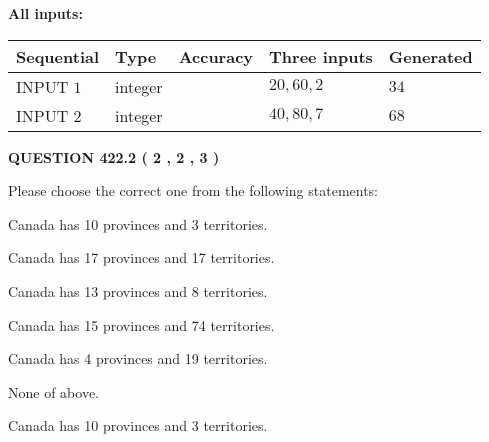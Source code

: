 \documentclass[12pt]{article}
\begin{document}
   
   
   
\noindent{}
   
   
   
   
\noindent\vspace{0.1in}\hspace{-0.08in} {\textbf{\Large{All inputs: }}}
   
   
  
  
\noindent\begin{tabular}{|l|l|l|l|l|}
\hline
 Sequential & Type & Accuracy & Three inputs & Generated \\ 
\hline
 
 
  INPUT $  1 $ & integer &  & $
 20
 , 
 60
 , 
 2
 $ & $ 34 $ 
 \\  \hline  
 
 
  INPUT $  2 $ & integer &  & $
 40
 , 
 80
 , 
 7
 $ & $ 68 $ 
 \\  \hline  
 \end{tabular}
   
   
  
\vspace{0.2in}
  
{\textbf{\Large{QUESTION
422.2 
 ( 2 , 2 , 3 )
}}}
  
  
Please choose the correct one from the following statements:
 
 
Canada has 10  provinces and 3 territories.
 
 
Canada has  17 provinces and  17 territories.
 
 
Canada has  13 provinces and  8 territories.
 
 
Canada has  15 provinces and  74 territories.
 
 
Canada has   4 provinces and  19 territories.
 
 
 None of above.
 
 
\noindent{}
 
 
Canada has 10  provinces and 3 territories.
 
 
\noindent{}
 
 
   
\end{document}
